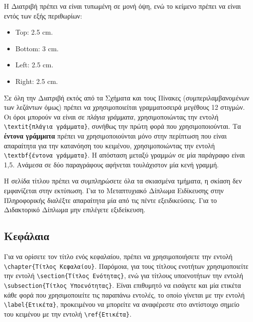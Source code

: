 Η Διατριβή πρέπει να είναι τυπωμένη σε μονή όψη, ενώ το κείμενο πρέπει να είναι εντός των εξής περιθωρίων:
\begin{itemize}
	\item Top: 2.5 cm.
	\item Bottom: 3 cm.
	\item Left: 2.5 cm.
	\item Right: 2.5 cm.
\end{itemize}
Σε όλη την Διατριβή εκτός από τα Σχήματα και τους Πίνακες (συμπεριλαμβανομένων των λεζάντων όμως) πρέπει να χρησιμοποιείται γραμματοσειρά μεγέθους 12 στιγμών.
Οι όροι μπορούν να είναι σε \textit{πλάγια γράμματα}, χρησιμοποιώντας την εντολή \verb|\textit{πλάγια γράμματα}|, συνήθως την πρώτη φορά που χρησιμοποιούνται.
Τα \textbf{έντονα γράμματα} πρέπει να χρησιμοποιούνται μόνο στην περίπτωση που είναι απαραίτητα για την κατανόηση του κειμένου, χρησιμοποιώντας την εντολή \verb|\textbf{έντονα γράμματα}|.
{\color{red}Η απόσταση μεταξύ γραμμών σε μία παράγραφο είναι 1,5.
Ανάμεσα σε δύο παραγράφους αφήνεται τουλάχιστον μία κενή γραμμή.}

{\color{red}
Η σελίδα τίτλου πρέπει να συμπληρώσετε όλα τα σκιασμένα τμήματα, η
σκίαση δεν εμφανίζεται στην εκτύπωση. Για το Μεταπτυχιακό Δίπλωμα
Ειδίκευσης στην Πληροφορικής διαλέξτε απαραίτητα μία από τις πέντε
εξειδικεύσεις. Για το Διδακτορικό Δίπλωμα μην επιλέγετε
εξιδείκευση.}

\subsection{Κεφάλαια}
\label{subsec:Chapters}

Για να ορίσετε τον τίτλο ενός κεφαλαίου, πρέπει να χρησιμοποιήσετε την εντολή \verb|\chapter{Τίτλος Κεφαλαίου}|.
Παρόμοια, για τους τίτλους ενοτήτων χρησιμοποιείτε την εντολή \verb|\section{Τίτλος Ενότητας}|, ενώ για τίτλους υποενοτήτων την εντολή \verb|\subsection{Τίτλος Υποενότητας}|.
Είναι επιθυμητό να εισάγετε και μία ετικέτα κάθε φορά που χρησιμοποιείτε τις παραπάνω εντολές, το οποίο γίνεται με την εντολή \verb|\label{Ετικέτα}|, προκειμένου να μπορείτε να αναφέρεστε στο αντίστοιχο σημείο του κειμένου με την εντολή \verb|\ref{Ετικέτα}|.

